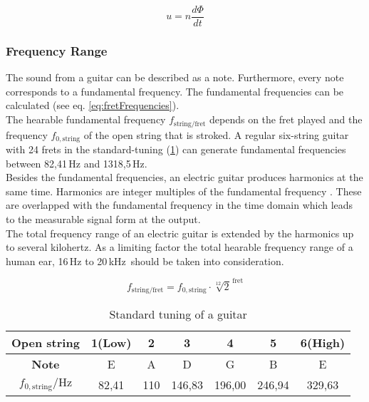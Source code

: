 \begin{equation}
u=n \frac{d\Phi}{dt}
\label{eq:faraday}
\end{equation}

\subsubsection{Frequency Range}\label{subsec:FrequencyRange}

The sound from a guitar can be described as a note. Furthermore, every note corresponds to a fundamental frequency.
The fundamental frequencies can be calculated (see eq. \ref{eq:fretFrequencies}).\\
The hearable fundamental frequency $f_{\mathrm{string/fret}}$ depends on the fret played and the frequency $f_{0,\mathrm{string}}$ of the open string that is stroked.
A regular six-string guitar with 24 frets in the standard-tuning (\ref{tab:tableFrequencies}) can generate fundamental frequencies between 82,41\,Hz and 1318,5\,Hz.\\
Besides the fundamental frequencies, an electric guitar produces harmonics at the same time.
Harmonics are integer multiples of the fundamental frequency \cite[p.\,150]{Gorne:2015}. These are overlapped with the fundamental 
frequency in the time domain which leads to the measurable signal form at the output.\\
The total frequency range of an electric guitar is extended by the harmonics up to several kilohertz.
As a limiting factor the total hearable frequency range of a human ear, 16\,Hz to 20\,kHz\,\cite[p.\,28]{Gorne:2015} should be taken into consideration.



\begin{equation}
f_{\mathrm{string/fret}} = f_{0,\mathrm{string}}\cdot \sqrt[12]{2}^{\,\mathrm{fret}}
\label{eq:fretFrequencies}
\end{equation}

\begin{table}[H]
\begin{center}
	\begin{tabular}{|c||c|c|c|c|c|c|}
	\hline 
	\textbf{Open string} & 1(Low) & 2 & 3 & 4 & 5 & 6(High) \\ 
	\hline 
	\textbf{Note} & E & A & D & G & B & E \\ 
	\hline 
	$f_{0,\mathrm{string}}/\mathrm{Hz}$ & 82,41 & 110 & 146,83 & 196,00 & 246,94 & 329,63 \\ 
	\hline 
	\end{tabular} 
\caption[Bla]{Standard tuning of a guitar\footnotemark}
\end{center}
\label{tab:tableFrequencies}
\end{table}




